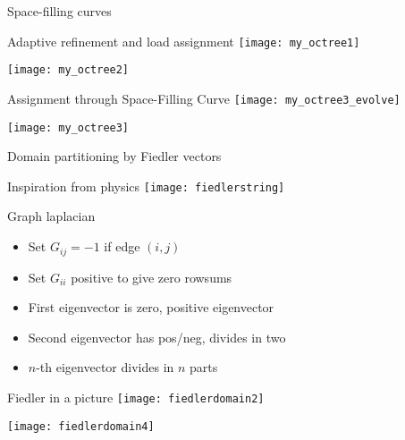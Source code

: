  {Space-filling curves}

\begin{numberedframe}{Adaptive refinement and load assignment}
  \texttt{[image: my\_octree1]}

  \texttt{[image: my\_octree2]}
\end{numberedframe}

\begin{numberedframe}{Assignment through Space-Filling Curve}
  \texttt{[image: my\_octree3\_evolve]}
  
  \texttt{[image: my\_octree3]}

\end{numberedframe}

 {Domain partitioning by Fiedler vectors}

\begin{numberedframe}{Inspiration from physics}
\texttt{[image: fiedlerstring]}
\end{numberedframe}

\begin{numberedframe}{Graph laplacian}
\begin{itemize}
\item Set $G_{ij}=-1$ if edge $(i,j)$
\item Set $G_{ii}$ positive to give zero rowsums
\item First eigenvector is zero, positive eigenvector
\item Second eigenvector has pos/neg, divides in two
\item $n$-th eigenvector divides in $n$ parts
\end{itemize}
\end{numberedframe}

\begin{numberedframe}{Fiedler in a picture}
\texttt{[image: fiedlerdomain2]}

\texttt{[image: fiedlerdomain4]}
\end{numberedframe}
